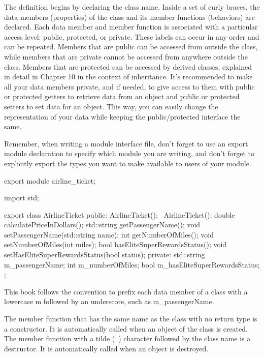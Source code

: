 The definition begins by declaring the class name. Inside a set of curly braces, the data members (properties) of the class and its member functions (behaviors) are declared. Each data member and member function is associated with a particular access level: public, protected, or private. These labels can occur in any order and can be repeated. Members that are public can be accessed from outside the class, while members that are private cannot be accessed from anywhere outside the class. Members that are protected can be accessed by derived classes, explained in detail in Chapter 10 in the context of inheritance. It’s recommended to make all your data members private, and if needed, to give access to them with public or protected getters to retrieve data from an object and public or protected setters to set data for an object. This way, you can easily change the representation of your data while keeping the public/protected interface the same.

Remember, when writing a module interface file, don’t forget to use an export module declaration to specify which module you are writing, and don’t forget to explicitly export the types you want to make available to users of your module.

\begin{cpp}
export module airline_ticket;

import std;

export class AirlineTicket
{
    public:
        AirlineTicket();
        ~AirlineTicket();
        double calculatePriceInDollars();
        std::string getPassengerName();
        void setPassengerName(std::string name);
        int getNumberOfMiles();
        void setNumberOfMiles(int miles);
        bool hasEliteSuperRewardsStatus();
        void setHasEliteSuperRewardsStatus(bool status);
    private:
        std::string m_passengerName;
        int m_numberOfMiles;
        bool m_hasEliteSuperRewardsStatus;
};
\end{cpp}

This book follows the convention to prefix each data member of a class with a lowercase m followed by an underscore, such as m\_passengerName.

The member function that has the same name as the class with no return type is a constructor. It is automatically called when an object of the class is created. The member function with a tilde (~) character followed by the class name is a destructor. It is automatically called when an object is destroyed.

